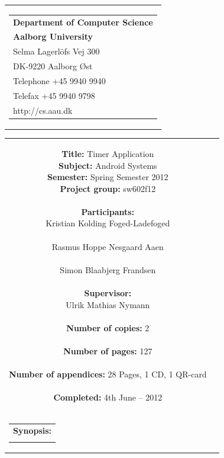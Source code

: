 \begin{nopagebreak}
\samepage 
\begin{tabular}{r}
\parbox{\textwidth}{
\hfill \parbox{6.2cm}{\begin{tabular}{l}
{\textsf\small \textbf{Department of Computer Science }}\\
{\textsf\small  \textbf{Aalborg University}}\\
{\textsf\small Selma Lagerlöfs Vej 300}\\
{\textsf\small DK-9220 Aalborg Øst}\\
{\textsf\small Telephone +45 9940 9940}\\
{\textsf\small Telefax +45 9940 9798}\\
{\textsf\small http://cs.aau.dk}
\end{tabular}}}
\end{tabular}

\begin{tabular}{cc}
\parbox{7cm}{
\textbf{Title:} 
Timer Application\\
\textbf{Subject:} 
Android Systems\\
\textbf{Semester:} Spring Semester 2012\\
\textbf{Project group:} sw602f12\\ \\
\textbf{Participants:} \\
Kristian Kolding Foged-Ladefoged \\ \\
Rasmus Hoppe Nesgaard Aaen \\ \\
Simon Blaabjerg Frandsen \\ \\
\textbf{Supervisor:} \\
Ulrik Mathias Nymann\\ \\
\textbf{Number of copies:}
2 \\ \\
\textbf{Number of pages:}
127 \\ \\
\textbf{Number of appendices:}
28 Pages, 1 CD, 1 QR-card\\ \\
\textbf{Completed:}
4th June -- 2012 \\ \\
}

\parbox{7cm}{
\vspace{.15cm}
\hfill 
\begin{tabular}{l}
\textbf{Synopsis:} \\
\fbox{
\parbox{6.5cm}{
{\vfill{\small {}\bigskip}}
}}
\end{tabular}}
\end{tabular}


\end{nopagebreak}